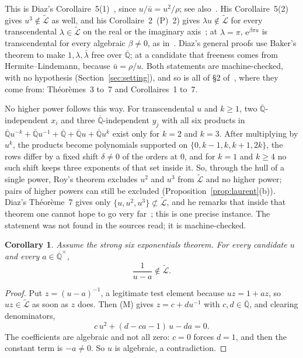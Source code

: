 \documentclass[11pt,a4paper]{article}
\theoremstyle{plain}
\newtheorem{corollary}[theorem]{Corollary}
\theoremstyle{definition}
\newcommand{\e}{\mathrm{e}}
\newcommand{\Alg}{\overline{\mathbb{Q}}}
\newcommand{\aLogs}{\widetilde{\mathcal{L}}}
\begin{document}
This is Diaz's Corollaire~5(1)~\cite{diaz-2007}, since $u/\bar u=u^{2}/\rho$; see
also~\cite[Th\'eor\`eme~3(1)]{diaz-2004}. His Corollaire~5(2) gives $u^{3}\notin\aLogs$ as well,
and his Corollaire~2~(P)~2) gives $\lambda u\notin\aLogs$ for every transcendental
$\lambda\in\aLogs$ on the real or the imaginary axis~\cite[p.~381]{diaz-2007}; at $\lambda=\pi$,
$\e^{\beta\pi u}$ is transcendental for every algebraic $\beta\neq0$, as in~\cite[Th\'eor\`eme~3(2)]{diaz-2004}.
Diaz's general proofs use Baker's theorem to make $1,\lambda,\bar\lambda$ free over $\Alg$; at a
candidate that freeness comes from Hermite--Lindemann, because $\bar u=\rho/u$. Both statements are
machine-checked, with no hypothesis (Section~\ref{sec:setting}),
and so is all of \S2 of~\cite{diaz-2007}, where
they come from: Th\'eor\`emes~3 to~7 and Corollaires~1 to~7.

No higher power follows this way. For transcendental $u$ and $k\ge1$, two $\Alg$-independent $x_{i}$
and three $\Alg$-independent $y_{j}$ with all six products in
$\Alg u^{-k}+\Alg u^{-1}+\Alg+\Alg u+\Alg u^{k}$ exist only for $k=2$ and $k=3$. After multiplying by
$u^{k}$, the products become polynomials supported on $\{0,k-1,k,k+1,2k\}$, the rows differ by a
fixed shift $\delta\neq0$ of the orders at $0$, and for $k=1$ and $k\ge4$ no such shift keeps three
exponents of that set inside it. So, through the hull of a single power, Roy's theorem excludes $u^{2}$ and
$u^{3}$ from $\aLogs$ and no higher power; pairs of higher powers can still be excluded
(Proposition~\ref{prop:laurent}(b)). Diaz's Th\'eor\`eme~7 gives only
$\{u,u^{2},u^{3}\}\not\subset\aLogs$, and he remarks that inside that theorem one cannot hope to go
very far~\cite[p.~390]{diaz-2007}; this is one precise instance. The statement was not found in the
sources read; it is machine-checked.

\begin{corollary}\label{cor:recip}
Assume the strong six exponentials theorem. For every candidate $u$ and every $a\in\Alg^{\times}$,
\[
  \frac{1}{u-a}\notin\aLogs .
\]
\end{corollary}

\begin{proof}
Put $z=(u-a)^{-1}$, a legitimate test element because $uz=1+az$, so $uz\in\aLogs$ as soon as
$z$ does. Then (M) gives $z=c+du^{-1}$ with $c,d\in\Alg$, and clearing denominators,
\[
  c\,u^{2}+(d-ca-1)\,u-da=0 .
\]
The coefficients are algebraic and not all zero: $c=0$ forces $d=1$, and then the constant term
is $-a\neq0$. So $u$ is algebraic, a contradiction.
\end{proof}
\end{document}
